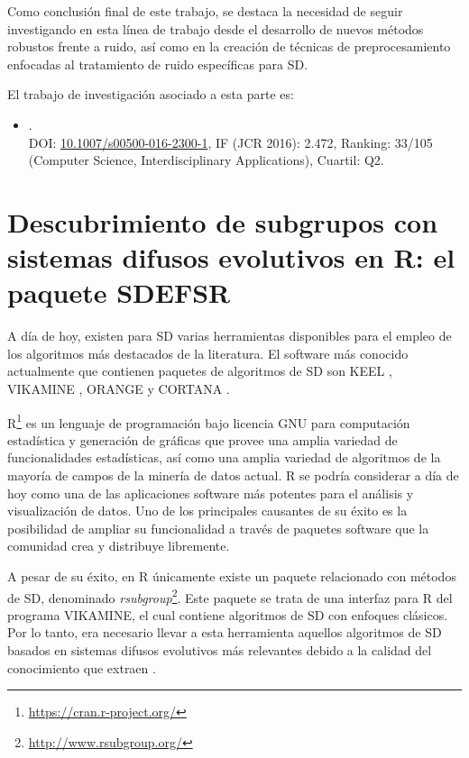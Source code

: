 \documentclass[c5paper,10pt,twoside]{book}	   	%
\newcommand{\doi}[1]{\href{https://doi.org/#1}{#1}}
\begin{document}
Como conclusión final de este trabajo, se destaca la necesidad de seguir investigando en esta línea de trabajo desde el desarrollo de nuevos métodos robustos frente a ruido, así como en la creación de técnicas de preprocesamiento enfocadas al tratamiento de ruido específicas para \ac{SD}.

El trabajo de investigación asociado a esta parte es:

\begin{itemize}
	\item {}. \\DOI: \doi{10.1007/s00500-016-2300-1}, IF (JCR 2016): 2.472, Ranking: 33/105 (Computer Science, Interdisciplinary Applications), Cuartil: Q2.
\end{itemize}

\section{Descubrimiento de subgrupos con sistemas difusos evolutivos en R: el paquete SDEFSR} \label{sec:paqueteR}

A día de hoy, existen para \ac{SD} varias herramientas disponibles para el empleo de los algoritmos más destacados de la literatura. El software más conocido actualmente que contienen paquetes de algoritmos de \ac{SD} son KEEL \cite{KEEL3}, VIKAMINE \cite{Al12}, ORANGE \cite{Orange} y CORTANA \cite{Kl11}.

R\footnote{\url{https://cran.r-project.org/}} es un lenguaje de programación bajo licencia GNU para computación estadística y generación de gráficas que provee una amplia variedad de funcionalidades estadísticas, así como una amplia variedad de algoritmos de la mayoría de campos de la minería de datos actual. R se podría considerar a día de hoy como una de las aplicaciones software más potentes para el análisis y visualización de datos. Uno de los principales causantes de su éxito es la posibilidad de ampliar su funcionalidad a través de paquetes software que la comunidad crea y distribuye libremente. 

A pesar de su éxito, en R únicamente existe un paquete relacionado con métodos de \ac{SD}, denominado \textit{rsubgroup}\footnote{\url{http://www.rsubgroup.org/}}. Este paquete se trata de una interfaz para R del programa VIKAMINE, el cual contiene algoritmos de \ac{SD} con enfoques clásicos. Por lo tanto, era necesario llevar a esta herramienta aquellos algoritmos de \ac{SD} basados en sistemas difusos evolutivos más relevantes debido a la calidad del conocimiento que extraen \cite{Cgdh14}.
\end{document}
